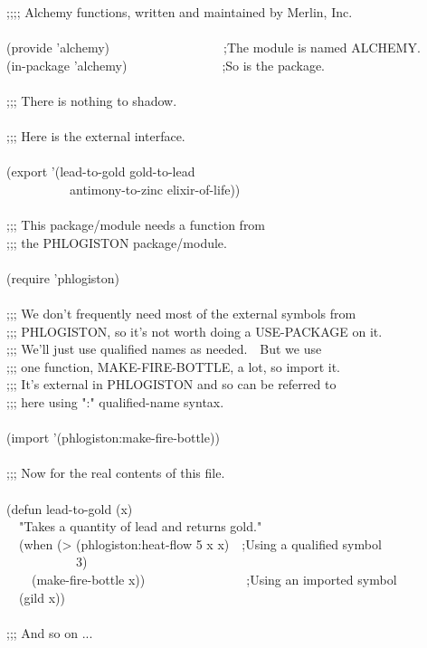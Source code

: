 \begin{table}
\caption{File \protect{}}
\label{ALCHEMY-FILE-TABLE}
\begin{lisp}
;;;; Alchemy functions, written and maintained by Merlin, Inc. \\
 \\[4pt]
(provide 'alchemy)~~~~~~~~~~~~~~~~~~;The module is named ALCHEMY. \\
(in-package 'alchemy)~~~~~~~~~~~~~~~;So is the package. \\
 \\[4pt]
;;; There is nothing to shadow. \\
 \\[4pt]
;;; Here is the external interface. \\
 \\[4pt]
(export '(lead-to-gold gold-to-lead  \\
~~~~~~~~~~antimony-to-zinc elixir-of-life)) \\
 \\[4pt]
;;; This package/module needs a function from \\
;;; the PHLOGISTON package/module. \\
 \\[4pt]
(require 'phlogiston) \\
 \\[4pt]
;;; We don't frequently need most of the external symbols from \\
;;; PHLOGISTON, so it's not worth doing a USE-PACKAGE on it. \\
;;; We'll just use qualified names as needed.~~But we use \\
;;; one function, MAKE-FIRE-BOTTLE, a lot, so import it. \\
;;; It's external in PHLOGISTON and so can be referred to \\
;;; here using ":" qualified-name syntax. \\
 \\[4pt]
(import '(phlogiston:make-fire-bottle)) \\
 \\[4pt]
;;; Now for the real contents of this file. \\
 \\[4pt]
(defun lead-to-gold (x) \\
~~"Takes a quantity of lead and returns gold." \\
~~(when (> (phlogiston:heat-flow 5 x x)~~;Using a qualified symbol \\
~~~~~~~~~~~3) \\
~~~~(make-fire-bottle x))~~~~~~~~~~~~~~~~;Using an imported symbol \\
~~(gild x)) \\
 \\[4pt]
;;; And so on ...
\end{lisp}
\vfill
\end{table}


